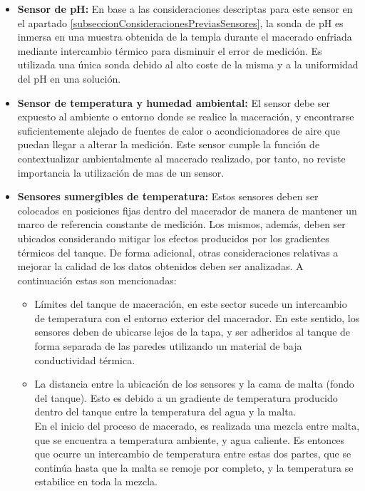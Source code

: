     \begin{itemize}
    
        \item \textbf{Sensor de pH: }En base a las consideraciones descriptas para este sensor en el apartado \ref{subseccionConsideracionesPreviasSensores}, la sonda de pH es inmersa en una muestra obtenida de la templa durante el macerado enfriada mediante intercambio térmico para disminuir el error de medición. Es utilizada una única sonda debido al alto coste de la misma y a la uniformidad del pH en una solución.
        
        \item \textbf{Sensor de temperatura y humedad ambiental: } El sensor debe ser expuesto al ambiente o entorno donde se realice la maceración, y encontrarse suficientemente alejado de fuentes de calor o acondicionadores de aire que puedan llegar a alterar la medición. Este sensor cumple la función de contextualizar ambientalmente al macerado realizado, por tanto, no reviste importancia la utilización de mas de un sensor.
        
        \item \textbf{Sensores sumergibles de temperatura: } Estos sensores deben ser colocados en posiciones fijas dentro del macerador de manera de mantener un marco de referencia constante de medición. Los mismos, además, deben ser ubicados considerando mitigar los efectos producidos por los gradientes térmicos del tanque. De forma adicional, otras consideraciones relativas a mejorar la calidad de los datos obtenidos deben ser analizadas. A continuación estas son mencionadas:
        \begin{itemize}
        
            \item Límites del tanque de maceración, en este sector sucede un intercambio de temperatura con el entorno exterior del macerador. En este sentido, los sensores deben de ubicarse lejos de la tapa, y ser adheridos al tanque de forma separada de las paredes utilizando un material de baja conductividad térmica.
            
            \item 
            La distancia entre la ubicación de los sensores y la cama de malta (fondo del tanque). Esto es debido a un gradiente de temperatura producido dentro del tanque entre la temperatura del agua y la malta.\\
            En el inicio del proceso de macerado, es realizada una mezcla entre malta, que se encuentra a temperatura ambiente, y agua caliente. Es entonces que ocurre un intercambio de temperatura entre estas dos partes, que se continúa hasta que la malta se remoje por completo, y la temperatura se estabilice en toda la mezcla.
            

\end{itemize}
\end{itemize}
